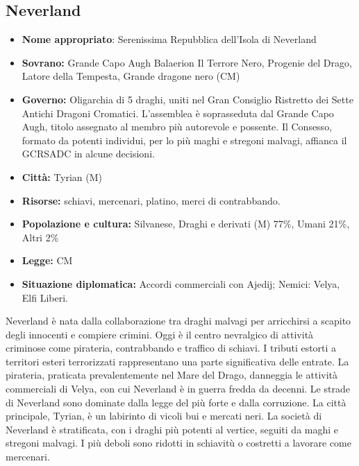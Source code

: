 \documentclass[a4paper]{report}
\begin{document}
\begin{multicols}{2}
\subsection*{Neverland}
\begin{itemize}
	\item \textbf{Nome appropriato}: Serenissima Repubblica dell'Isola di Neverland
	\item \textbf{Sovrano:} Grande Capo Augh Balaerion Il Terrore Nero, Progenie del Drago, Latore della Tempesta, Grande dragone nero (CM)
	\item \textbf{Governo:} Oligarchia di 5 draghi, uniti nel Gran Consiglio Ristretto dei Sette Antichi Dragoni Cromatici. L'assemblea è soprasseduta dal Grande Capo Augh, titolo assegnato al membro più autorevole e possente. Il Consesso, formato da potenti individui, per lo più maghi e stregoni malvagi, affianca il GCRSADC in alcune decisioni.
	\item \textbf{Città:} Tyrian (M)
	\item \textbf{Risorse:} schiavi, mercenari, platino, merci di contrabbando.
	\item \textbf{Popolazione e cultura:} Silvanese, Draghi e derivati (M) 77\%, Umani 21\%, Altri 2\%
	\item \textbf{Legge:} CM
	\item \textbf{Situazione diplomatica:} Accordi commerciali con Ajedij; Nemici: Velya, Elfi Liberi.
\end{itemize}
Neverland è nata dalla collaborazione tra draghi malvagi per arricchirsi a scapito degli innocenti e compiere crimini. Oggi è il centro nevralgico di attività criminose come pirateria, contrabbando e traffico di schiavi. I tributi estorti a territori esteri terrorizzati rappresentano una parte significativa delle entrate. La pirateria, praticata prevalentemente nel Mare del Drago, danneggia le attività commerciali di Velya, con cui Neverland è in guerra fredda da decenni.
Le strade di Neverland sono dominate dalla legge del più forte e dalla corruzione. La città principale, Tyrian, è un labirinto di vicoli bui e mercati neri.
La società di Neverland è stratificata, con i draghi più potenti al vertice, seguiti da maghi e stregoni malvagi. I più deboli sono ridotti in schiavitù o costretti a lavorare come mercenari.



\end{multicols}
\end{document}
